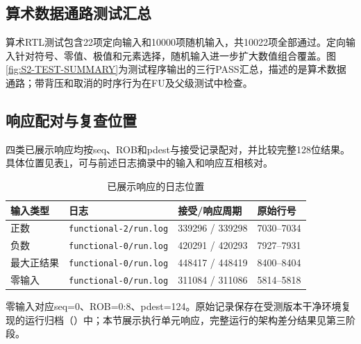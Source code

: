 \subsection{算术数据通路测试汇总}
算术RTL测试包含22项定向输入和10000项随机输入，共10022项全部通过。定向输入针对符号、零值、极值和元素选择，随机输入进一步扩大数值组合覆盖。图\ref{fig:S2-TEST-SUMMARY}为测试程序输出的三行PASS汇总，描述的是算术数据通路；带背压和取消的时序行为在FU及父级测试中检查。


\subsection{响应配对与复查位置}
四类已展示响应均按seq、ROB和pdest与接受记录配对，并比较完整128位结果。具体位置见表\ref{tab:s2-response-pairs}，可与前述日志摘录中的输入和响应互相核对。
\begin{table}[!htbp]\centering
\small
\caption{已展示响应的日志位置}\label{tab:s2-response-pairs}
\begin{tabular}{llll}
\toprule
输入类型 & 日志 & 接受/响应周期 & 原始行号\\
\midrule
正数 & \texttt{functional-2/run.log} & 339296 / 339298 & 7030--7034\\
负数 & \texttt{functional-0/run.log} & 420291 / 420293 & 7927--7931\\
最大正结果 & \texttt{functional-0/run.log} & 448417 / 448419 & 8400--8404\\
零输入 & \texttt{functional-0/run.log} & 311084 / 311086 & 5814--5818\\
\bottomrule
\end{tabular}
\end{table}
零输入对应seq=0、ROB=0:8、pdest=124。原始记录保存在受测版本干净环境复现的运行归档（）中；本节展示执行单元响应，完整运行的架构差分结果见第三阶段。
